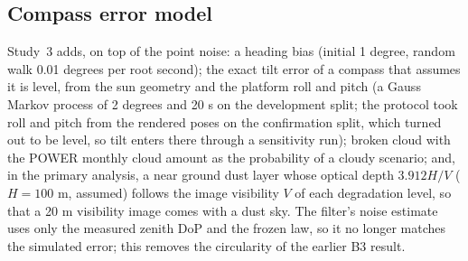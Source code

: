 \subsection{Compass error model}
Study~3 adds, on top of the point noise: a heading bias (initial 1 degree, random walk 0.01 degrees per root second); the exact tilt error of a compass that assumes it is level, from the sun geometry and the platform roll and pitch (a Gauss Markov process of 2 degrees and 20 s on the development split; the protocol took roll and pitch from the rendered poses on the confirmation split, which turned out to be level, so tilt enters there through a sensitivity run); broken cloud with the POWER monthly cloud amount as the probability of a cloudy scenario; and, in the primary analysis, a near ground dust layer whose optical depth $3.912H/V$ ($H = 100$ m, assumed) follows the image visibility $V$ of each degradation level, so that a 20 m visibility image comes with a dust sky. The filter's noise estimate uses only the measured zenith DoP and the frozen law, so it no longer matches the simulated error; this removes the circularity of the earlier B3 result.

